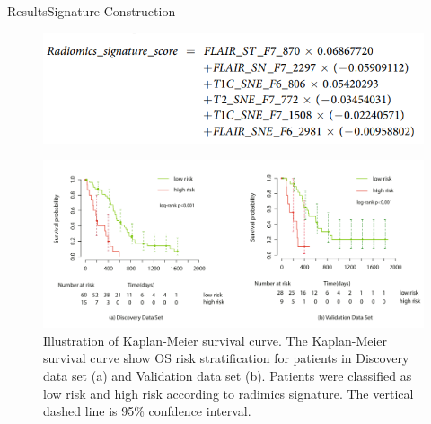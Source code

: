 \documentclass[
]{beamer}
\begin{document}
\begin{frame}{Results}{Signature Construction}
\begin{figure}
	\includegraphics[scale=0.5]{form2}
\end{figure}
\end{frame}

\begin{frame}
\begin{figure}
	\includegraphics[scale=0.45]{km1}
	\caption{Illustration of Kaplan-Meier survival curve. The Kaplan-Meier survival curve show OS risk
		stratification for patients in Discovery data set (a) and Validation data set (b). Patients were classified as low risk
		and high risk according to radimics signature. The vertical dashed line is 95\% confdence interval.}
\end{figure}
\end{frame}
\end{document}

